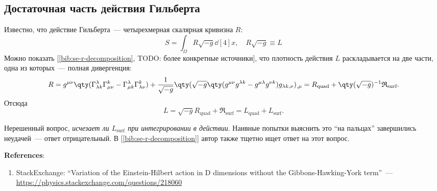 \documentclass[\docroot/reports/draft/report.tex]{subfiles}
\begin{document}
\onlyinsubfile{\tableofcontents}

\subsection{Достаточная часть действия Гильберта}

    Известно, что действие Гильберта~--- четырехмерная скалярная кривизна $R$:
    \begin{equation*}
        S = \int_\Omega R \sqrt{-g} \dd[4]{x} , \quad R \sqrt{-g} \equiv L
    \end{equation*}
    Можно показать [\ref{bib:se-r-decomposition}, TODO: более конкретные источники], что плотность действия $L$ раскладывается на две части, одна из которых~--- полная дивергенция:
    \begin{equation*}
        R = g^{\mu\nu} \qty(
            \Gamma^\lambda_{\lambda k}\Gamma^k_{\mu\nu} -
            \Gamma^\lambda_{\mu k}\Gamma^k_{\lambda\nu}
            ) + \frac{1}{\sqrt{-g}} \qty(
                \sqrt{-g} \qty(g^{\mu\nu}g^{\lambda k} - g^{\mu\lambda}g^{\nu k}) g_{\lambda k, \nu}
            )_{,\mu} = R_\text{quad} + \qty(\sqrt{-g})^{-1} \mathfrak{R}_\text{surf}.
    \end{equation*}
    Отсюда
    \begin{equation*}
        L = \sqrt{-g} R_\text{quad} + \mathfrak{R}_\text{surf} = L_\text{quad} + L_\text{surf} .
    \end{equation*}

    Нерешенный вопрос, \textit{исчезает ли $L_\text{surf}$ при интегрировании в действии}. Наивные попытки выяснить это \enquote{на пальцах} завершились неудачей\footnotemark{}~--- ответ отрицательный. В [\ref{bib:se-r-decomposition}] автор также тщетно ищет ответ на этот вопрос.


    \vspace{1cm}

    \textbf{\Large{References}}:
    \begin{enumerate}
        \item \label{bib:se-r-decomposition} StackExchange: \enquote{Variation of the Einstein-Hilbert action in D dimensions without the Gibbons-Hawking-York term}~--- \url{https://physics.stackexchange.com/questions/218060}
    \end{enumerate}

\end{document}
